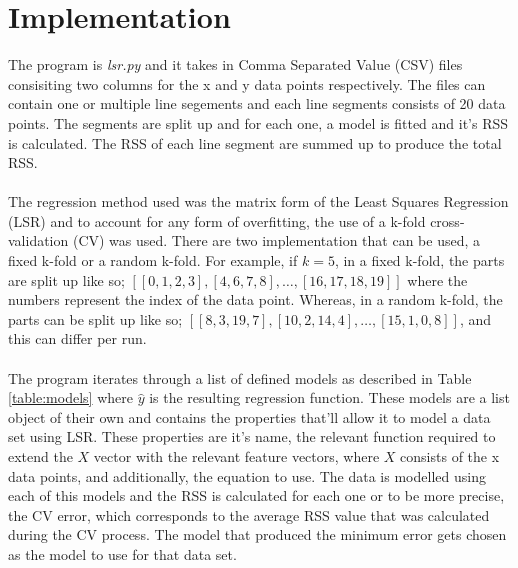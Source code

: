 \documentclass[a4paper,11pt]{article}
\begin{document}
\section{Implementation}
The program is \textit{lsr.py} and it takes in Comma Separated Value (CSV) files
consisiting two columns for the x and y data points respectively. The files can
contain one or multiple line segements and each line segments consists of 20
data points. The segments are split up and for each one, a model is fitted
and it's RSS is calculated. The RSS of each line segment are summed up to
produce the total RSS.
\\ \\
The regression method used was the matrix form of the Least Squares Regression (LSR)
and to account for any form of overfitting, the use of a k-fold cross-validation (CV)
was used. There are two implementation that can be used, a fixed k-fold
or a random k-fold. For example, if $k = 5$, in a fixed k-fold, the parts are split up
like so; $[[0, 1, 2, 3], [4, 6, 7, 8], \dots, [16, 17, 18, 19]]$ where the
numbers represent the index of the data point. Whereas, in a random k-fold, the parts
can be split up like so; $[[8, 3, 19, 7], [10, 2, 14, 4], \dots, [15, 1, 0, 8]]$,
and this can differ per run. 
\\ \\
The program iterates through a list of defined models as described in Table
\ref{table:models} where $\hat{y}$ is the resulting regression function. These
models are a list object of their own and contains the properties that'll allow it
to model a data set using LSR. These properties are it's name, the relevant function required
to extend the $X$ vector with the relevant feature vectors, where $X$ consists of the x
data points, and additionally, the equation to use. The data is modelled using
each of this models and the RSS is calculated for each one or to be more precise,
the CV error, which corresponds to the average RSS value that was calculated
during the CV process.  The model that produced the minimum error gets chosen
as the model to use for that data set.
\end{document}
